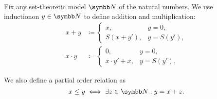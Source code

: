\begin{definition}\label{def:natural_number_operations}
  Fix any set-theoretic model \( \BN \) of the natural numbers. We use induction\IND on \( y \in \BN \) to define addition and multiplication:
  \begin{align*}
    x + y &\coloneqq \begin{cases}
      x, &y = 0, \\
      S(x + y'), &y = S(y'),
    \end{cases}
    \\
    x \cdot y &\coloneqq \begin{cases}
      0, &y = 0, \\
      x \cdot y' + x, &y = S(y'),
    \end{cases}
  \end{align*}

  We also define a partial order relation as
  \begin{equation*}
    x \leq y \iff \exists z \in \BN: y = x + z.
  \end{equation*}
\end{definition}

